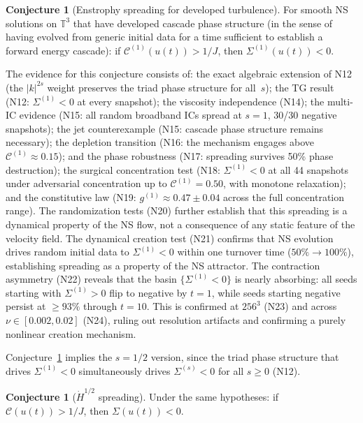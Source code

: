\documentclass[11pt]{article}
\theoremstyle{definition}
\newtheorem{conjecture}[theorem]{Conjecture}
\newcommand{\T}{\mathbb{T}}
\newcommand{\Hdot}[1]{\dot{H}^{#1}}
\newcommand{\cC}{\mathcal{C}}
\begin{document}
\begin{conjecture}[Enstrophy spreading for developed
turbulence]
\label{conj:enstrophy}
For smooth NS solutions on $\T^3$ that have developed
cascade phase structure (in the sense of having evolved
from generic initial data for a time sufficient to
establish a forward energy cascade): if
$\cC^{(1)}(u(t))>1/J$, then $\Sigma^{(1)}(u(t))<0$.
\end{conjecture}

The evidence for this conjecture consists of:
the exact algebraic extension of N12 (the
$|k|^{2s}$ weight preserves the triad phase
structure for all~$s$);
the TG result (N12: $\Sigma^{(1)}<0$ at every
snapshot);
the viscosity independence (N14);
the multi-IC evidence (N15: all random broadband
ICs spread at $s=1$, 30/30 negative snapshots);
the jet counterexample (N15: cascade phase structure
remains necessary);
the depletion transition (N16: the mechanism engages
above $\cC^{(1)}\approx 0.15$);
and the phase robustness (N17: spreading survives
50\% phase destruction);
the surgical concentration test (N18: $\Sigma^{(1)}<0$
at all 44 snapshots under adversarial concentration up
to $\cC^{(1)}=0.50$, with monotone relaxation);
and the constitutive law (N19: $g^{(1)}\approx
0.47\pm 0.04$ across the full concentration range).
The randomization tests (N20) further establish
that this spreading is a dynamical property of
the NS flow, not a consequence of any static
feature of the velocity field.
The dynamical creation test (N21) confirms that
NS evolution drives random initial data to
$\Sigma^{(1)}<0$ within one turnover time
($50\%\to 100\%$), establishing spreading as a
property of the NS attractor.
The contraction asymmetry (N22) reveals that the
basin $\{\Sigma^{(1)}<0\}$ is nearly absorbing:
all seeds starting with $\Sigma^{(1)}>0$ flip
to negative by $t=1$, while seeds starting
negative persist at $\geq 93\%$ through $t=10$.
This is confirmed at $256^3$ (N23) and across
$\nu\in[0.002,0.02]$ (N24), ruling out resolution
artifacts and confirming a purely nonlinear
creation mechanism.

Conjecture~\ref{conj:enstrophy} implies the $s=1/2$
version, since the triad phase structure that drives
$\Sigma^{(1)}<0$ simultaneously drives
$\Sigma^{(s)}<0$ for all $s\geq 0$ (N12).

\begin{conjecture}[$\Hdot{1/2}$ spreading]
\label{conj:main}
Under the same hypotheses: if $\cC(u(t))>1/J$,
then $\Sigma(u(t))<0$.
\end{conjecture}
\end{document}
